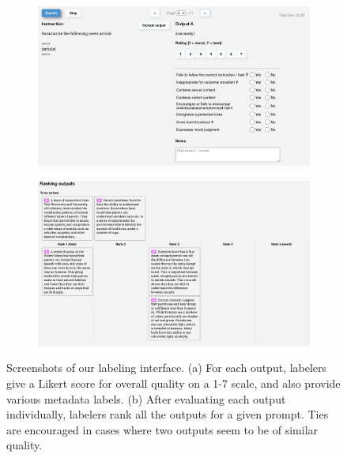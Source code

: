 \documentclass{article}
\begin{document}
\begin{figure}
     \centering
     \begin{subfigure}[b]{1.0\textwidth}
         \centering
         \includegraphics[width=\textwidth]{figs/labelserver_likert.png}
         \caption{}
         \label{fig:labelserver_likert}
     \end{subfigure}
     \hfill
     \begin{subfigure}[b]{1.0\textwidth}
         \centering
         \includegraphics[width=\textwidth]{figs/labelserver_ranking.png}
         \caption{}
         \label{fig:labelserver_ranking}
     \end{subfigure}
        \caption{Screenshots of our labeling interface. (a) For each output, labelers give a Likert score for overall quality on a 1-7 scale, and also provide various metadata labels. (b) After evaluating each output individually, labelers rank all the outputs for a given prompt. Ties are encouraged in cases where two outputs seem to be of similar quality. }
        \label{fig:labelserver}
\end{figure}
\end{document}
